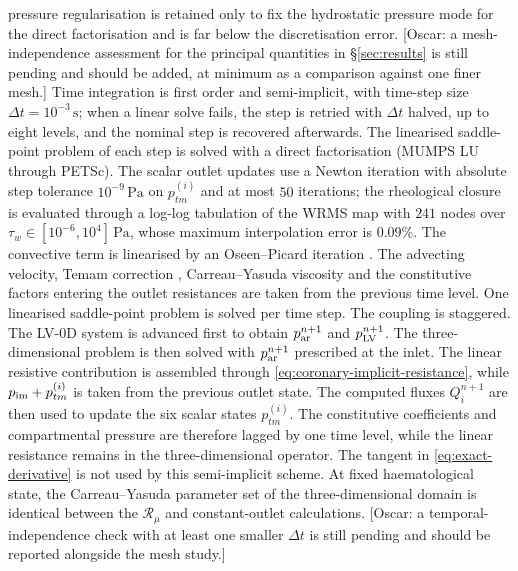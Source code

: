 \documentclass[lineno]{jfm}
\begin{document}
pressure regularisation is retained only to fix the hydrostatic pressure mode
for the direct factorisation and is far below the discretisation error.
{\color{red}[Oscar: a mesh-independence assessment for the principal
quantities in \S\ref{sec:results} is still pending and should be added, at
minimum as a comparison against one finer mesh.]}
Time integration is first order and semi-implicit, with time-step size
$\Delta t=10^{-3}\,\mathrm{s}$; when a linear solve fails, the step is
retried with $\Delta t$ halved, up to eight levels, and the nominal step is
recovered afterwards. The linearised saddle-point problem of each step is
solved with a direct factorisation (MUMPS LU through PETSc). The scalar
outlet updates use a Newton iteration with absolute step tolerance
$10^{-9}\,\mathrm{Pa}$ on $p_{tm}^{(i)}$ and at most $50$ iterations; the
rheological closure is evaluated through a log-log tabulation of the WRMS
map with $241$ nodes over $\tau_w\in[10^{-6},10^{4}]\,\mathrm{Pa}$, whose
maximum interpolation error is $0.09\%$. The convective term is linearised
by an Oseen--Picard iteration \citep{ElmanSilvesterWathen2014}. The
advecting velocity, Temam correction \citep{Temam2001}, Carreau--Yasuda
viscosity and the constitutive factors entering the outlet resistances are
taken from the previous time level. One linearised saddle-point problem is
solved per time step.
The coupling is staggered. The LV-0D system is advanced first to obtain
$p_{\rm ar}^{n+1}$ and $p_{\rm LV}^{n+1}$. The three-dimensional problem is
then solved with $p_{\rm ar}^{n+1}$ prescribed at the inlet. The linear
resistive contribution is assembled through
\eqref{eq:coronary-implicit-resistance}, while
$p_{\rm im}+p_{tm}^{(i)}$ is taken from the previous outlet state. The computed
fluxes $Q_i^{n+1}$ are then used to update the six scalar states
$p_{tm}^{(i)}$.
The constitutive coefficients and compartmental pressure are therefore lagged
by one time level, while the linear resistance remains in the
three-dimensional operator. The tangent in \eqref{eq:exact-derivative} is not
used by this semi-implicit scheme. At fixed haematological state, the
Carreau--Yasuda parameter set of the three-dimensional domain is identical
between the $\mathcal{R}_{\mu}$ and constant-outlet calculations.
{\color{red}[Oscar: a temporal-independence check with at least one smaller
$\Delta t$ is still pending and should be reported alongside the mesh
study.]}
\end{document}
